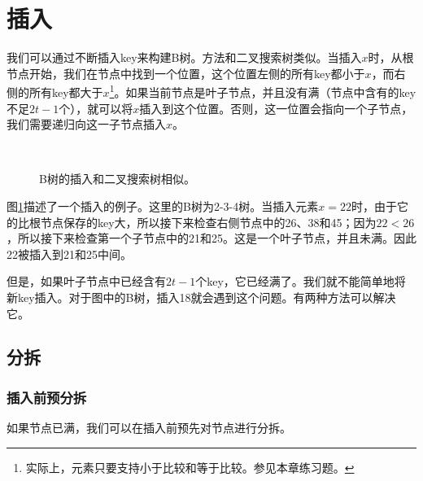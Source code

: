\documentclass[UTF8]{article}
\begin{document}
\section{插入}
\label{btree-insertion}

我们可以通过不断插入key来构建B树。方法和二叉搜索树类似。当插入$x$时，从根节点开始，我们在节点中找到一个位置，这个位置左侧的所有key都小于$x$，而右侧的所有key都大于$x$\footnote{实际上，元素只要支持小于比较和等于比较。参见本章练习题。}。如果当前节点是叶子节点，并且没有满（节点中含有的key不足$2t-1$个），就可以将$x$插入到这个位置。否则，这一位置会指向一个子节点，我们需要递归向这一子节点插入$x$。

\begin{figure}[htbp]
  \centering
   \\
  \caption{B树的插入和二叉搜索树相似。} \label{fig:btree-insert-simple}
\end{figure}

图\ref{fig:btree-insert-simple}描述了一个插入的例子。这里的B树为2-3-4树。当插入元素$x=22$时，由于它的比根节点保存的key大，所以接下来检查右侧节点中的26、38和45；因为$22 < 26$，所以接下来检查第一个子节点中的21和25。这是一个叶子节点，并且未满。因此22被插入到21和25中间。

但是，如果叶子节点中已经含有$2t-1$个key，它已经满了。我们就不能简单地将新key插入。对于图中的B树，插入18就会遇到这个问题。有两种方法可以解决它。

\subsection{分拆}
\label{split}

\subsubsection{插入前预分拆}

如果节点已满，我们可以在插入前预先对节点进行分拆。
\end{document}

